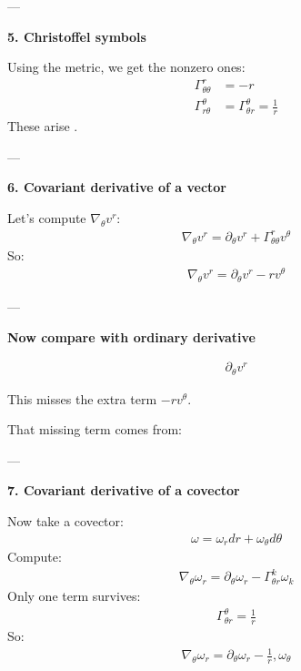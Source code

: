 \documentclass[12pt,a4paper]{report}
\begin{document}
\begin{description}
\begin{description}
---

\item \textbf{5. Christoffel symbols}

Using the metric, we get the nonzero ones:
\begin{align*}
\Gamma^r_{\theta\theta} &= -r \\
\Gamma^\theta_{r\theta} &= \Gamma^\theta_{\theta r} = \frac{1}{r}
\end{align*}
These arise .

---

\item \textbf{6. Covariant derivative of a vector}

Let’s compute $\nabla_\theta v^r$:
\begin{align*}
\nabla_\theta v^r = \partial_\theta v^r + \Gamma^r_{\theta\theta} v^\theta
\end{align*}
So:
\begin{align*}
\boxed{
\nabla_\theta v^r = \partial_\theta v^r - r v^\theta
}
\end{align*}

---

\textbf{Now compare with ordinary derivative}

\begin{align*}
\partial_\theta v^r
\end{align*}

This misses the extra term $-r v^\theta$.

That missing term comes from:


---

\item \textbf{7. Covariant derivative of a covector}

Now take a covector:
\begin{align*}
\omega = \omega_r dr + \omega_\theta d\theta
\end{align*}
Compute:
\begin{align*}
\nabla_\theta \omega_r = \partial_\theta \omega_r - \Gamma^k_{\theta r} \omega_k
\end{align*}
Only one term survives:
\begin{align*}
\Gamma^\theta_{\theta r} = \frac{1}{r}
\end{align*}
So:
\begin{align*}
\boxed{
\nabla_\theta \omega_r = \partial_\theta \omega_r - \frac{1}{r},\omega_\theta
}
\end{align*}


\end{description}
\end{description}
\end{document}
